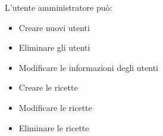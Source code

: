 \documentclass[a4paper]{article}
\begin{document}
\vspace{3mm}

L'utente amministratore può:
\begin{itemize}
    \item Creare nuovi utenti
    \item Eliminare gli utenti
    \item Modificare le informazioni degli utenti
    \item Creare le ricette
    \item Modificare le ricette
    \item Eliminare le ricette
\end{itemize}
\end{document}
